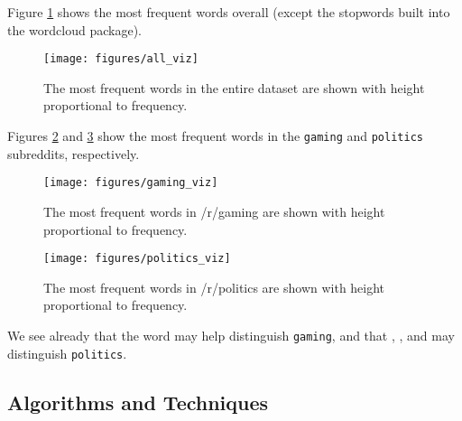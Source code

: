 \documentclass[]{article}
\begin{document}
Figure \ref{fig:wordcloud_all} shows the most frequent words overall (except the stopwords built into the wordcloud package). 
\begin{figure}[h]
\centering
\texttt{[image: figures/all\_viz]}
\caption{The most frequent words in the entire dataset are shown with height proportional to frequency.}
\label{fig:wordcloud_all}
\end{figure}
Figures \ref{fig:wordcloud_gaming} and \ref{fig:wordcloud_politics} show the most frequent words in the \texttt{gaming} and \texttt{politics} subreddits, respectively.
\begin{figure}[h]
\centering
\texttt{[image: figures/gaming\_viz]}
\caption{The most frequent words in /r/gaming are shown with height proportional to frequency.}
\label{fig:wordcloud_gaming}
\end{figure}
\begin{figure}[h]
\centering
\texttt{[image: figures/politics\_viz]}
\caption{The most frequent words in /r/politics are shown with height proportional to frequency.}
\label{fig:wordcloud_politics}
\end{figure}
We see already that the word  may help distinguish \texttt{gaming}, and that , , and  may distinguish \texttt{politics}.

\subsection{Algorithms and Techniques}
\end{document}
